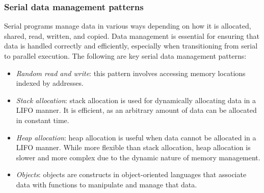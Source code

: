 \subsubsection{Serial data management patterns}
Serial programs manage data in various ways depending on how it is allocated, shared, read, written, and copied.
Data management is essential for ensuring that data is handled correctly and efficiently, especially when transitioning from serial to parallel execution.
The following are key serial data management patterns:
\begin{itemize}
    \item \textit{Random read and write}: this pattern involves accessing memory locations indexed by addresses. 
    \item \textit{Stack allocation}: stack allocation is used for dynamically allocating data in a LIFO manner. 
        It is efficient, as an arbitrary amount of data can be allocated in constant time. 
    \item \textit{Heap allocation}: heap allocation is useful when data cannot be allocated in a LIFO manner. 
        While more flexible than stack allocation, heap allocation is slower and more complex due to the dynamic nature of memory management. 
    \item \textit{Objects}: objects are constructs in object-oriented languages that associate data with functions to manipulate and manage that data.
\end{itemize}


